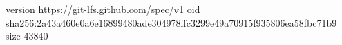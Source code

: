 version https://git-lfs.github.com/spec/v1
oid sha256:2a43a460e0a6e16899480ade304978ffc3299e49a70915f935806ea58fbc71b9
size 43840
